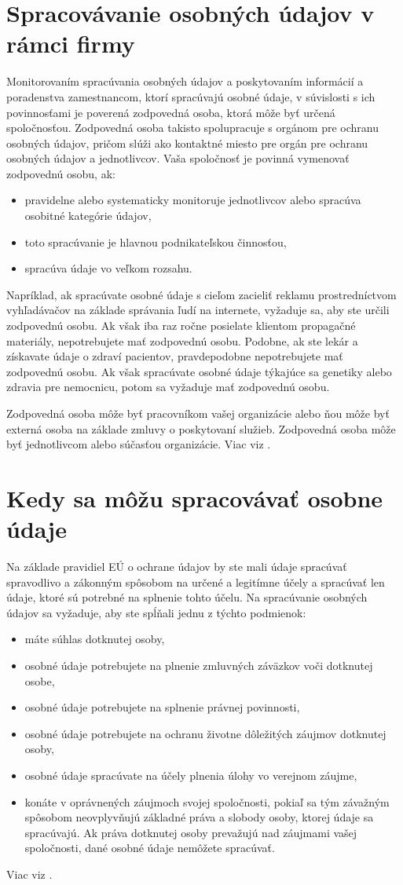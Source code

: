 \section{Spracovávanie osobných údajov v rámci firmy}
Monitorovaním spracúvania osobných údajov a poskytovaním informácií a poradenstva zamestnancom, ktorí spracúvajú osobné údaje, v súvislosti s ich povinnosťami je poverená zodpovedná osoba, ktorá môže byť určená spoločnosťou. Zodpovedná osoba takisto spolupracuje s orgánom pre ochranu osobných údajov, pričom slúži ako kontaktné miesto pre orgán pre ochranu osobných údajov a jednotlivcov.
\newpage
Vaša spoločnosť je povinná vymenovať zodpovednú osobu, ak:
\begin{itemize}
\item pravidelne alebo systematicky monitoruje jednotlivcov alebo spracúva osobitné kategórie údajov,
\item toto spracúvanie je hlavnou podnikateľskou činnosťou,
\item spracúva údaje vo veľkom rozsahu.
\end{itemize}
Napríklad, ak spracúvate osobné údaje s cieľom zacieliť reklamu prostredníctvom vyhľadávačov na základe správania ľudí na internete, vyžaduje sa, aby ste určili zodpovednú osobu. Ak však iba raz ročne posielate klientom propagačné materiály, nepotrebujete mať zodpovednú osobu. Podobne, ak ste lekár a získavate údaje o zdraví pacientov, pravdepodobne nepotrebujete mať zodpovednú osobu. Ak však spracúvate osobné údaje týkajúce sa genetiky alebo zdravia pre nemocnicu, potom sa vyžaduje mať zodpovednú osobu.

Zodpovedná osoba môže byť pracovníkom vašej organizácie alebo ňou môže byť externá osoba na základe zmluvy o poskytovaní služieb. Zodpovedná osoba môže byť jednotlivcom alebo súčasťou organizácie. Viac viz \cite{strankaP}.
\section{Kedy sa môžu spracovávať osobne údaje}
Na základe pravidiel EÚ o ochrane údajov by ste mali údaje spracúvať spravodlivo a zákonným spôsobom na určené a legitímne účely a spracúvať len údaje, ktoré sú potrebné na splnenie tohto účelu. Na spracúvanie osobných údajov sa vyžaduje, aby ste spĺňali jednu z týchto podmienok:
\begin{itemize}
\item máte súhlas dotknutej osoby,
\item osobné údaje potrebujete na plnenie zmluvných záväzkov voči dotknutej osobe,
\item osobné údaje potrebujete na splnenie právnej povinnosti,
\item osobné údaje potrebujete na ochranu životne dôležitých záujmov dotknutej osoby,
\item osobné údaje spracúvate na účely plnenia úlohy vo verejnom záujme,
\item konáte v oprávnených záujmoch svojej spoločnosti, pokiaľ sa tým závažným spôsobom neovplyvňujú základné práva a slobody osoby, ktorej údaje sa spracúvajú. Ak práva dotknutej osoby prevažujú nad záujmami vašej spoločnosti, dané osobné údaje nemôžete spracúvať.
\end{itemize}
Viac viz \cite{strankaP}.
\newpage
